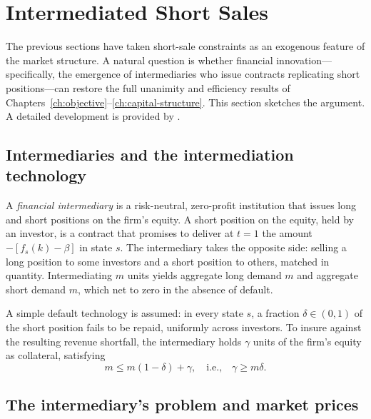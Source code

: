 \documentclass[11pt,a4paper,oneside]{book}
\def\leq{\leqslant}
\def\geq{\geqslant}
\theoremstyle{plain}
\theoremstyle{definition}
\theoremstyle{remark}
\numberwithin{equation}{chapter}
\begin{document}
\section{Intermediated Short Sales}
\label{sec:intermediated}

The previous sections have taken short-sale constraints as an exogenous feature of the market structure.
A natural question is whether financial innovation---specifically, the emergence of intermediaries who issue contracts replicating short positions---can restore the full unanimity and efficiency results of Chapters~\ref{ch:objective}--\ref{ch:capital-structure}.
This section sketches the argument.
A detailed development is provided by \citet{BisinGottardiRuta2015}.

\subsection{Intermediaries and the intermediation technology}

A \emph{financial intermediary} is a risk-neutral, zero-profit institution that issues long and short positions on the firm's equity.
A short position on the equity, held by an investor, is a contract that promises to deliver at $t=1$ the amount $-[f_s(k) - \beta]$ in state $s$.
The intermediary takes the opposite side: selling a long position to some investors and a short position to others, matched in quantity.
Intermediating $m$ units yields aggregate long demand $m$ and aggregate short demand $m$, which net to zero in the absence of default.

A simple default technology is assumed: in every state $s$, a fraction $\delta \in (0, 1)$ of the short position fails to be repaid, uniformly across investors.
To insure against the resulting revenue shortfall, the intermediary holds $\gamma$ units of the firm's equity as collateral, satisfying
\begin{equation}\label{eq:collateral}
  m \leq m(1 - \delta) + \gamma,
  \quad \text{i.e.,} \quad
  \gamma \geq m \delta.
\end{equation}

\subsection{The intermediary's problem and market prices}
\end{document}
